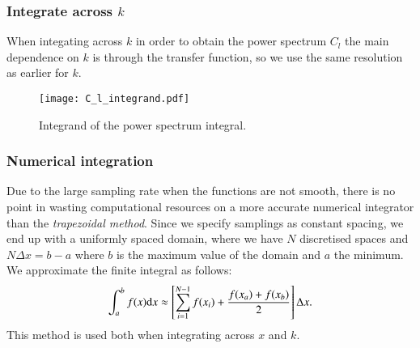     \subsubsection{Integrate across $k$}
        When integating across $k$ in order to obtain the power spectrum $C_l$ the main dependence on $k$ is through the transfer function, so we use the same resolution as earlier for $k$. 
        \begin{figure}
            \texttt{[image: C\_l\_integrand.pdf]}
            \caption{Integrand of the power spectrum integral. }
            \label{fig:m3:C_l_integrand}
        \end{figure}


    \subsubsection{Numerical integration}
        Due to the large sampling rate when the functions are not smooth, there is no point in wasting computational resources on a more accurate numerical integrator than the \textit{trapezoidal method}. Since we specify samplings as constant spacing, we end up with a uniformly spaced domain, where we have $N$ discretised spaces and $N\Delta x= b-a$ where $b$ is the maximum value of the domain and $a$ the minimum. We approximate the finite integral as follows:
        \begin{equation}
            \int_a^bf(x)\mathrm{d} x \approx \left[ \sum_{i=1}^{N-1}f(x_i) + \frac{f(x_a)+f(x_b)}{2} \right]\Delta x.
        \end{equation}
        This method is used both when integrating across $x$ and $k$. 


